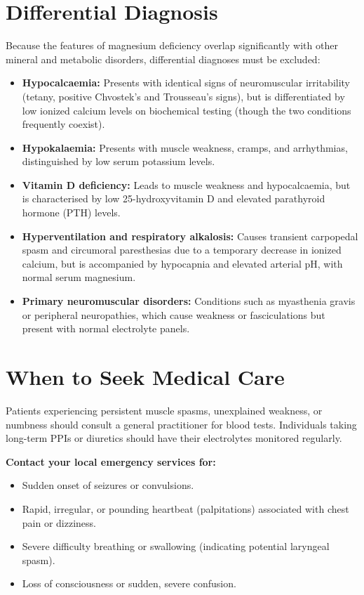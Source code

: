 \section*{Differential Diagnosis}
Because the features of magnesium deficiency overlap significantly with other mineral and metabolic disorders, differential diagnoses must be excluded:
\begin{itemize}
    \item \textbf{Hypocalcaemia:} Presents with identical signs of neuromuscular irritability (tetany, positive Chvostek's and Trousseau's signs), but is differentiated by low ionized calcium levels on biochemical testing (though the two conditions frequently coexist).
    \item \textbf{Hypokalaemia:} Presents with muscle weakness, cramps, and arrhythmias, distinguished by low serum potassium levels.
    \item \textbf{Vitamin D deficiency:} Leads to muscle weakness and hypocalcaemia, but is characterised by low 25-hydroxyvitamin D and elevated parathyroid hormone (PTH) levels.
    \item \textbf{Hyperventilation and respiratory alkalosis:} Causes transient carpopedal spasm and circumoral paresthesias due to a temporary decrease in ionized calcium, but is accompanied by hypocapnia and elevated arterial pH, with normal serum magnesium.
    \item \textbf{Primary neuromuscular disorders:} Conditions such as myasthenia gravis or peripheral neuropathies, which cause weakness or fasciculations but present with normal electrolyte panels.
\end{itemize}

\section*{When to Seek Medical Care}
Patients experiencing persistent muscle spasms, unexplained weakness, or numbness should consult a general practitioner for blood tests. Individuals taking long-term PPIs or diuretics should have their electrolytes monitored regularly.

\textbf{Contact your local emergency services for:}
\begin{itemize}
    \item Sudden onset of seizures or convulsions.
    \item Rapid, irregular, or pounding heartbeat (palpitations) associated with chest pain or dizziness.
    \item Severe difficulty breathing or swallowing (indicating potential laryngeal spasm).
    \item Loss of consciousness or sudden, severe confusion.
\end{itemize}

